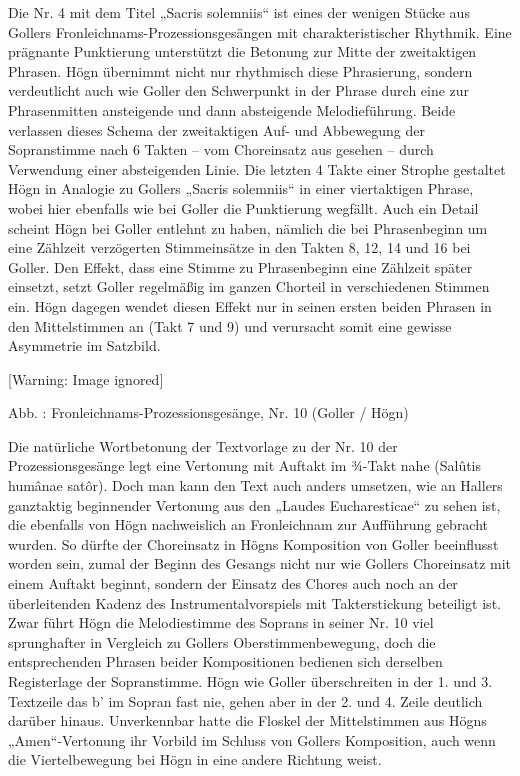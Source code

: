 \documentclass[a4paper]{article}
\newcounter{Abb}
\renewcommand\theAbb{\arabic{Abb}}
\begin{document}
Die Nr. 4 mit dem Titel „Sacris solemniis“ ist eines der wenigen Stücke
aus Gollers Fronleichnams-Prozessionsgesängen mit charakteristischer
Rhythmik. Eine prägnante Punktierung unterstützt die Betonung zur Mitte
der zweitaktigen Phrasen. Högn übernimmt nicht nur rhythmisch diese
Phrasierung, sondern verdeutlicht auch wie Goller den Schwerpunkt in
der Phrase durch eine zur Phrasenmitten ansteigende und dann
absteigende Melodieführung. Beide verlassen dieses Schema der
zweitaktigen Auf- und Abbewegung der Sopranstimme nach 6 Takten – vom
Choreinsatz aus gesehen – durch Verwendung einer absteigenden Linie.
Die letzten 4 Takte einer Strophe gestaltet Högn in Analogie zu Gollers
„Sacris solemniis“ in einer viertaktigen Phrase, wobei hier ebenfalls
wie bei Goller die Punktierung wegfällt. Auch ein Detail scheint Högn
bei Goller entlehnt zu haben, nämlich die bei Phrasenbeginn um eine
Zählzeit verzögerten Stimmeinsätze in den Takten 8, 12, 14 und 16 bei
Goller. Den Effekt, dass eine Stimme zu Phrasenbeginn eine Zählzeit
später einsetzt, setzt Goller regelmäßig im ganzen Chorteil in
verschiedenen Stimmen ein. Högn dagegen wendet diesen Effekt nur in
seinen ersten beiden Phrasen in den Mittelstimmen an (Takt 7 und 9) und
verursacht somit eine gewisse Asymmetrie im Satzbild.

  [Warning: Image ignored] %
 

Abb. \stepcounter{Abb}{\theAbb}: Fronleichnams-Prozessionsgesänge, Nr.
10 (Goller / Högn)

Die natürliche Wortbetonung der Textvorlage zu der Nr. 10 der
Prozessionsgesänge legt eine Vertonung mit Auftakt im ¾-Takt nahe
(Salûtis humânae satôr). Doch man kann den Text auch anders umsetzen,
wie an Hallers ganztaktig beginnender Vertonung aus den „Laudes
Eucharesticae“ zu sehen ist, die ebenfalls von Högn nachweislich an
Fronleichnam zur Aufführung gebracht wurden. So dürfte der Choreinsatz
in Högns Komposition von Goller beeinflusst worden sein, zumal der
Beginn des Gesangs nicht nur wie Gollers Choreinsatz mit einem Auftakt
beginnt, sondern der Einsatz des Chores auch noch an der überleitenden
Kadenz des Instrumentalvorspiels mit Takterstickung beteiligt ist. Zwar
führt Högn die Melodiestimme des Soprans in seiner Nr. 10 viel
sprunghafter in Vergleich zu Gollers Oberstimmenbewegung, doch die
entsprechenden Phrasen beider Kompositionen bedienen sich derselben
Registerlage der Sopranstimme. Högn wie Goller überschreiten in der 1.
und 3. Textzeile das b’ im Sopran fast nie, gehen aber in der 2. und 4.
Zeile deutlich darüber hinaus. Unverkennbar hatte die Floskel der
Mittelstimmen aus Högns „Amen“-Vertonung ihr Vorbild im Schluss von
Gollers Komposition, auch wenn die Viertelbewegung bei Högn in eine
andere Richtung weist.
\end{document}
